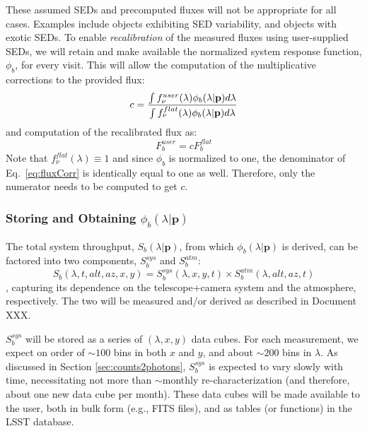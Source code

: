 \documentclass[12pt,preprint]{aastex}
\begin{document}
These assumed SEDs and precomputed fluxes will not be appropriate for all cases. Examples include objects exhibiting SED variability, and objects with exotic SEDs. 
To enable {\em recalibration} of the measured fluxes using user-supplied SEDs, we will retain and make available the normalized system response function, $\phi_b$, for every visit. This will allow the computation of the multiplicative corrections to the provided flux:
%
\begin{equation} \label{eq:fluxCorr}
    c = { \int f_\nu^{user}(\lambda) \phi_b(\lambda|\mathbf{p}) d\lambda \over \int f_\nu^{flat}(\lambda) \phi_b(\lambda|\mathbf{p}) d\lambda }
\end{equation}
%
and computation of the recalibrated flux as:
%
\begin{equation}
     F_b^{user} = c F_b^{flat}
\end{equation}
%
Note that $f_\nu^{flat}(\lambda) \equiv 1$ and since $\phi_b$ is normalized to one, the denominator of Eq.~\ref{eq:fluxCorr} is identically equal to one as well. Therefore, only the numerator needs to be computed to get $c$.

\subsubsection{Storing and Obtaining $\phi_b(\lambda|\mathbf{p})$}

The total system throughput, $S_b(\lambda | \mathbf{p})$, from which $\phi_b(\lambda | \mathbf{p})$ is derived, can be factored into two components, $S_b^{sys}$ and $S_b^{atm}$:
%
\begin{equation}
    S_b(\lambda, t, alt, az, x, y) = S_b^{sys}(\lambda, x, y, t) \times S_b^{atm}(\lambda, alt, az, t)
\end{equation}
%
, capturing its dependence on the telescope+camera system and the atmosphere, respectively. The two will be measured and/or derived as described in Document XXX.

$S_b^{sys}$ will be stored as a series of $(\lambda, x, y)$ data cubes. For each measurement, we expect on order of $\sim 100$ bins in both $x$ and $y$, and about $\sim 200$ bins in $\lambda$. As discussed in Section \ref{sec:counts2photons}, $S_b^{sys}$ is expected to vary slowly with time, necessitating not more than $\sim$monthly re-characterization (and therefore, about one new data cube per month). These data cubes will be made available to the user, both in bulk form (e.g., FITS files), and as tables (or functions) in the LSST database.
\end{document}
